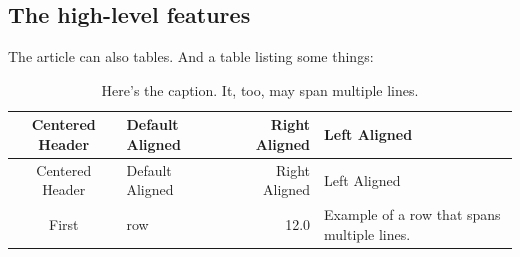 \documentclass[]{article}
\begin{document}
\subsection{The high-level features}\label{the-high-level-features}

The article can also tables. And a table listing some things:

\begin{longtable}[c]{@{}clrl@{}}
\caption{Here's the caption. It, too, may span multiple
lines.}\tabularnewline
\toprule
\begin{minipage}[b]{0.15\columnwidth}\centering\strut
Centered Header
\strut\end{minipage} &
\begin{minipage}[b]{0.10\columnwidth}\raggedright\strut
Default Aligned
\strut\end{minipage} &
\begin{minipage}[b]{0.20\columnwidth}\raggedleft\strut
Right Aligned
\strut\end{minipage} &
\begin{minipage}[b]{0.31\columnwidth}\raggedright\strut
Left Aligned
\strut\end{minipage}\tabularnewline
\midrule
\endfirsthead
\toprule
\begin{minipage}[b]{0.15\columnwidth}\centering\strut
Centered Header
\strut\end{minipage} &
\begin{minipage}[b]{0.10\columnwidth}\raggedright\strut
Default Aligned
\strut\end{minipage} &
\begin{minipage}[b]{0.20\columnwidth}\raggedleft\strut
Right Aligned
\strut\end{minipage} &
\begin{minipage}[b]{0.31\columnwidth}\raggedright\strut
Left Aligned
\strut\end{minipage}\tabularnewline
\midrule
\endhead
\begin{minipage}[t]{0.15\columnwidth}\centering\strut
First
\strut\end{minipage} &
\begin{minipage}[t]{0.10\columnwidth}\raggedright\strut
row
\strut\end{minipage} &
\begin{minipage}[t]{0.20\columnwidth}\raggedleft\strut
12.0
\strut\end{minipage} &
\begin{minipage}[t]{0.31\columnwidth}\raggedright\strut
Example of a row that spans multiple lines.

\end{minipage}
\end{longtable}
\end{document}
